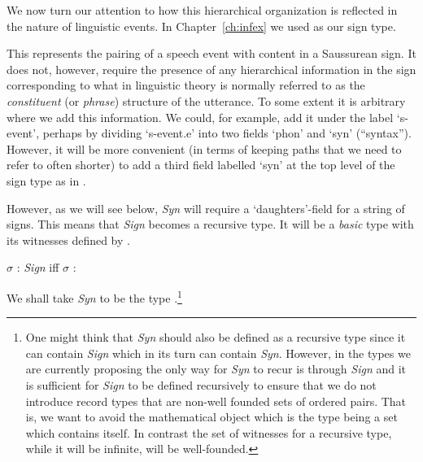 We now turn our attention to how this hierarchical organization is
reflected in the nature of linguistic events.  In
Chapter~\ref{ch:infex} we used \nexteg{} as our sign type.
\begin{ex} 
\end{ex} 
This represents the pairing of a speech event with content in a
Saussurean sign.  It does not, however, require the presence of any
hierarchical information in the sign corresponding to what in
linguistic theory is normally referred to as the \textit{constituent} (or
\textit{phrase}) structure of the utterance.  To some extent it is
arbitrary where we add this information.  We could, for example, add
it under the label `s-event', perhaps by dividing `s-event.e' into two
fields `phon' and `syn' (``syntax'').  However, it will be more
convenient (in terms of keeping paths that we need to refer to often
shorter) to add a third field labelled `syn' at the top level of the
sign type as in \nexteg{}.
\begin{ex} 
\end{ex}
However, as we will see below, \textit{Syn} will require a
`daughters'-field for a string of signs.  This means that
\textit{Sign} becomes a recursive type.  It will be a \textit{basic}
type with its witnesses defined by \nexteg{}.
\begin{ex} 
$\sigma$ : \textit{Sign} iff $\sigma$ :   
\end{ex} 
We shall take \textit{Syn} to be the type \nexteg{}.\footnote{One
  might think that \textit{Syn} should also be defined as a recursive
  type since it can contain \textit{Sign} which in its turn can
  contain \textit{Syn}.  However, in the types we are currently
  proposing the only way for \textit{Syn} to recur is through
  \textit{Sign} and it is sufficient for \textit{Sign} to
  be defined recursively to ensure that we do not introduce record
  types that are non-well founded sets of ordered pairs.  That is, we
  want to avoid the mathematical object which is the type being a set
  which contains itself.  In contrast the set of witnesses for
  a recursive type, while it will be infinite, will be well-founded.}
\begin{ex} 
\end{ex}

